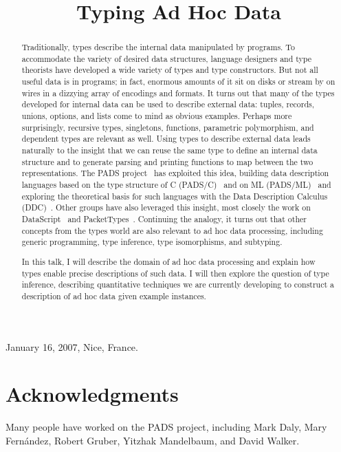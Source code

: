 \documentclass{sigplanconf}
\begin{document}
\authorpermission
{} {January 16, 2007, Nice, France.}

\title{Typing Ad Hoc Data}



\maketitle{}
\begin{abstract}
Traditionally, types describe the internal data manipulated by
programs.  To accommodate the variety of desired data structures,
language designers and type theorists have developed a wide variety of
types and type constructors.  But not all useful data is in programs;
in fact, enormous amounts of it sit on disks or stream by on wires in
a dizzying array of encodings and formats.  It turns out that many of
the types developed for internal data can be used to describe external
data: tuples, records, unions, options, and lists come to mind as
obvious examples.  Perhaps more surprisingly, recursive types,
singletons, functions, parametric polymorphism, and dependent types
are relevant as well.  Using types to describe external data leads
naturally to the insight that we can reuse the same type to define an
internal data structure and to generate parsing and printing functions
to map between the two representations.  The PADS
project~\cite{padsproject} has exploited this idea, building data
description languages based on the type structure of C
(PADS/C)~\cite{fisher+:pads} and on ML
(PADS/ML)~\cite{mandelbaum+:pads-ml} and exploring the theoretical
basis for such languages with the Data Description Calculus
(DDC)~\cite{fisher+:next700ddl}.
Other groups have also leveraged this
insight, most closely the work on DataScript~\cite{gpce02} and
PacketTypes~\cite{sigcomm00}. 
Continuing the analogy, it turns out that other concepts from the
types world are also relevant to ad hoc data processing, including
generic programming, type inference, type isomorphisms, and subtyping.

In this talk, I will describe the domain of ad hoc data processing and
explain how types enable precise descriptions of such data.  I will
then explore the question of type inference, describing quantitative
techniques we are currently developing to construct a description of
ad hoc data given example instances.


\end{abstract}
\section*{Acknowledgments}
Many people have worked on the PADS project, including 
Mark Daly, Mary Fern\'andez,
Robert Gruber, Yitzhak Mandelbaum, and David Walker. 



%

%
\end{document}
